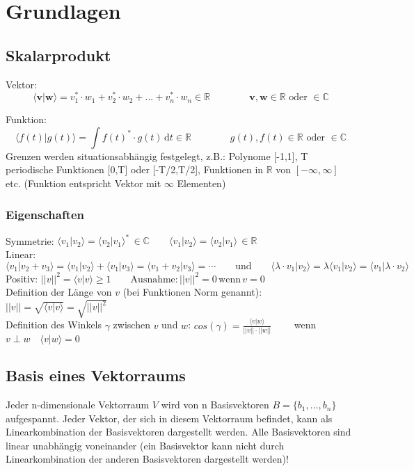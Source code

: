 \section{Grundlagen}

\subsection{Skalarprodukt}

Vektor:
\[
	\langle \mathbf{v}|\mathbf{w}\rangle = v_1^* \cdot w_1 + v_2^* \cdot w_2 + ... + v_n^* \cdot w_n  \in \mathbb{R} \qquad \qquad \mathbf{v},\mathbf{ w} \in \mathbb{R} \text{ oder } \in \mathbb{C} 
\]

Funktion:
\[  
	\langle f(t)|g(t) \rangle =  \int f(t)^*\cdot g(t) \,\mathrm{d}t \in \mathbb{R} \qquad \qquad g(t), f(t) \in \mathbb{R} \text{ oder } \in \mathbb{C}
\]
Grenzen werden situationsabhängig festgelegt, z.B.: Polynome [-1,1], T periodische Funktionen [0,T] oder [-T/2,T/2], Funktionen in $\mathbb{R}$ von $[-\infty,\infty]$ etc. (Funktion entspricht Vektor mit $\infty$ Elementen)

\subsubsection{Eigenschaften}
Symmetrie: $\langle v_1|v_2 \rangle = \langle v_2|v_1 \rangle^* \, \in \mathbb{C}  \qquad \langle v_1|v_2 \rangle = \langle v_2|v_1 \rangle \, \in \mathbb{R}$ \\
Linear: $\langle v_1|v_2 + v_3 \rangle = \langle v_1|v_2 \rangle + \langle v_1|v_3 \rangle =\langle v_1 + v_2|v_3 \rangle = \cdots  \qquad \text{und}\qquad \langle \lambda \cdot v_1|v_2 \rangle = \lambda \langle v_1|v_2 \rangle = \langle v_1|\lambda \cdot v_2 \rangle$\\
Positiv: $||v||^2 = \langle v|v \rangle \geq 1 \qquad \text{Ausnahme:} \, ||v||^2=0 \, \text{wenn} \, v=0$\\
Definition der Länge von $v$ (bei Funktionen Norm genannt): $||v|| = \sqrt{\langle v|v \rangle} = \sqrt{||v||^2}$\\
Definition des Winkels $\gamma$ zwischen $v$ und $w$: $cos(\gamma) = \frac{\langle v|w \rangle}{||v||\cdot ||w||} \qquad$ wenn $v \perp w  \quad \langle v|w \rangle = 0$


\subsection{Basis eines Vektorraums}
Jeder n-dimensionale Vektorraum $V$ wird von n Basisvektoren $B=\{ b_1,...,b_n \}$ aufgespannt. Jeder Vektor, der sich in diesem Vektorraum befindet, kann als Linearkombination der Basisvektoren dargestellt werden.  Alle Basisvektoren sind linear unabhängig voneinander (ein Basisvektor kann nicht durch Linearkombination der anderen Basisvektoren dargestellt werden)!

